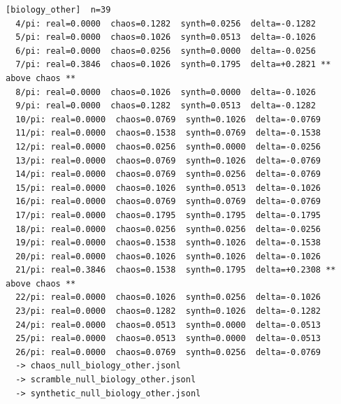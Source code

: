 \documentclass[11pt, letterpaper, openany]{book}
\begin{document}
\begin{empiricalbox}
\begin{lstlisting}[style=terminal]
[biology_other]  n=39
  4/pi: real=0.0000  chaos=0.1282  synth=0.0256  delta=-0.1282
  5/pi: real=0.0000  chaos=0.1026  synth=0.0513  delta=-0.1026
  6/pi: real=0.0000  chaos=0.0256  synth=0.0000  delta=-0.0256
  7/pi: real=0.3846  chaos=0.1026  synth=0.1795  delta=+0.2821 ** above chaos **
  8/pi: real=0.0000  chaos=0.1026  synth=0.0000  delta=-0.1026
  9/pi: real=0.0000  chaos=0.1282  synth=0.0513  delta=-0.1282
  10/pi: real=0.0000  chaos=0.0769  synth=0.1026  delta=-0.0769
  11/pi: real=0.0000  chaos=0.1538  synth=0.0769  delta=-0.1538
  12/pi: real=0.0000  chaos=0.0256  synth=0.0000  delta=-0.0256
  13/pi: real=0.0000  chaos=0.0769  synth=0.1026  delta=-0.0769
  14/pi: real=0.0000  chaos=0.0769  synth=0.0256  delta=-0.0769
  15/pi: real=0.0000  chaos=0.1026  synth=0.0513  delta=-0.1026
  16/pi: real=0.0000  chaos=0.0769  synth=0.0769  delta=-0.0769
  17/pi: real=0.0000  chaos=0.1795  synth=0.1795  delta=-0.1795
  18/pi: real=0.0000  chaos=0.0256  synth=0.0256  delta=-0.0256
  19/pi: real=0.0000  chaos=0.1538  synth=0.1026  delta=-0.1538
  20/pi: real=0.0000  chaos=0.1026  synth=0.1026  delta=-0.1026
  21/pi: real=0.3846  chaos=0.1538  synth=0.1795  delta=+0.2308 ** above chaos **
  22/pi: real=0.0000  chaos=0.1026  synth=0.0256  delta=-0.1026
  23/pi: real=0.0000  chaos=0.1282  synth=0.1026  delta=-0.1282
  24/pi: real=0.0000  chaos=0.0513  synth=0.0000  delta=-0.0513
  25/pi: real=0.0000  chaos=0.0513  synth=0.0000  delta=-0.0513
  26/pi: real=0.0000  chaos=0.0769  synth=0.0256  delta=-0.0769
  -> chaos_null_biology_other.jsonl
  -> scramble_null_biology_other.jsonl
  -> synthetic_null_biology_other.jsonl


\end{lstlisting}
\end{empiricalbox}
\end{document}
